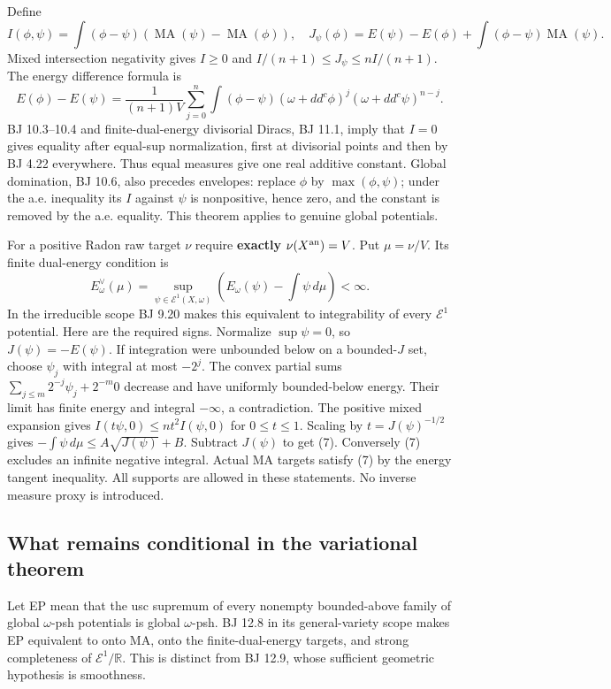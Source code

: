 \documentclass[
  11pt,
]{article}
\begin{document}
Define \[
 I(\phi,\psi)=\int(\phi-\psi)(\operatorname{MA}(\psi)-\operatorname{MA}(\phi)),
 \quad
 J_\psi(\phi)=E(\psi)-E(\phi)+\int(\phi-\psi)\operatorname{MA}(\psi).
\] Mixed intersection negativity gives \(I\ge0\) and
\(I/(n+1)\le J_\psi\le nI/(n+1)\). The energy difference formula is \[
 E(\phi)-E(\psi)=\frac1{(n+1)V}\sum_{j=0}^n
 \int(\phi-\psi)(\omega+dd^c\phi)^j(\omega+dd^c\psi)^{n-j}.
 \tag{6}
\] BJ 10.3--10.4 and finite-dual-energy divisorial Diracs, BJ 11.1,
imply that \(I=0\) gives equality after equal-sup normalization, first
at divisorial points and then by BJ 4.22 everywhere. Thus equal measures
give one real additive constant. Global domination, BJ 10.6, also
precedes envelopes: replace \(\phi\) by \(\max(\phi,\psi)\); under the
a.e. inequality its \(I\) against \(\psi\) is nonpositive, hence zero,
and the constant is removed by the a.e. equality. This theorem applies
to genuine global potentials.

For a positive Radon raw target \(\nu\) require \textbf{exactly}
\(\nu(X^{\rm an})=V\). Put \(\mu=\nu/V\). Its finite dual-energy
condition is \[
 E^\vee_\omega(\mu)=\sup_{\psi\in\mathcal E^1(X,\omega)}
              \left(E_\omega(\psi)-\int\psi\,d\mu\right)<\infty.
 \tag{7}
\] In the irreducible scope BJ 9.20 makes this equivalent to
integrability of every \(\mathcal E^1\) potential. Here are the required
signs. Normalize \(\sup\psi=0\), so \(J(\psi)=-E(\psi)\). If integration
were unbounded below on a bounded-\(J\) set, choose \(\psi_j\) with
integral at most \(-2^j\). The convex partial sums
\(\sum_{j\le m}2^{-j}\psi_j+2^{-m}0\) decrease and have uniformly
bounded-below energy. Their limit has finite energy and integral
\(-\infty\), a contradiction. The positive mixed expansion gives
\(I(t\psi,0)\le nt^2 I(\psi,0)\) for \(0\le t\le1\). Scaling by
\(t=J(\psi)^{-1/2}\) gives \(-\int\psi\,d\mu\le A\sqrt{J(\psi)}+B\).
Subtract \(J(\psi)\) to get (7). Conversely (7) excludes an infinite
negative integral. Actual MA targets satisfy (7) by the energy tangent
inequality. All supports are allowed in these statements. No inverse
measure proxy is introduced.

\subsection{What remains conditional in the variational
theorem}\label{what-remains-conditional-in-the-variational-theorem}

Let EP mean that the usc supremum of every nonempty bounded-above family
of global \(\omega\)-psh potentials is global \(\omega\)-psh. BJ 12.8 in
its general-variety scope makes EP equivalent to onto MA, onto the
finite-dual-energy targets, and strong completeness of
\(\mathcal E^1/\mathbb R\). This is distinct from BJ 12.9, whose
sufficient geometric hypothesis is smoothness.
\end{document}
